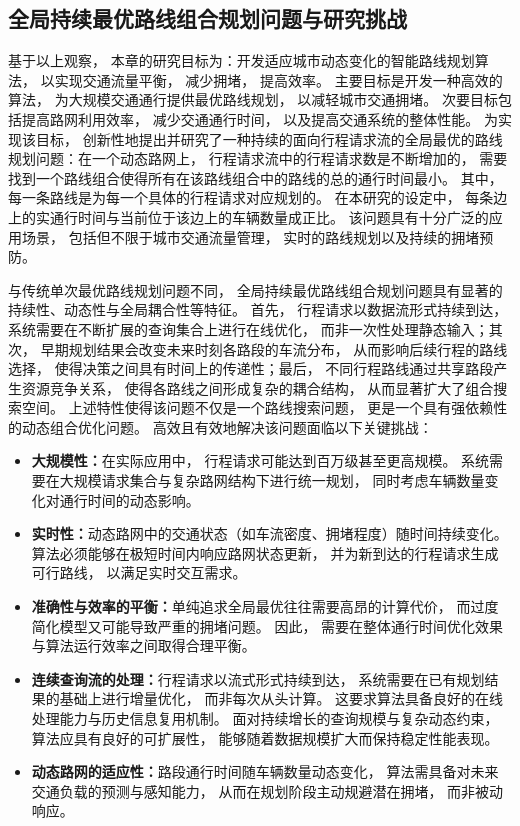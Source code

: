 \subsection{全局持续最优路线组合规划问题与研究挑战}
基于以上观察， 本章的研究目标为：开发适应城市动态变化的智能路线规划算法， 以实现交通流量平衡， 减少拥堵， 提高效率。 主要目标是开发一种高效的算法， 为大规模交通通行提供最优路线规划， 以减轻城市交通拥堵。 次要目标包括提高路网利用效率， 减少交通通行时间， 以及提高交通系统的整体性能。 为实现该目标， 创新性地提出并研究了一种持续的面向行程请求流的全局最优的路线规划问题：在一个动态路网上， 行程请求流中的行程请求数是不断增加的， 需要找到一个路线组合使得所有在该路线组合中的路线的总的通行时间最小。 其中， 每一条路线是为每一个具体的行程请求对应规划的。 在本研究的设定中， 每条边上的实通行时间与当前位于该边上的车辆数量成正比。 该问题具有十分广泛的应用场景， 包括但不限于城市交通流量管理， 实时的路线规划以及持续的拥堵预防。

与传统单次最优路线规划问题不同， 全局持续最优路线组合规划问题具有显著的持续性、动态性与全局耦合性等特征。 首先， 行程请求以数据流形式持续到达， 系统需要在不断扩展的查询集合上进行在线优化， 而非一次性处理静态输入；其次， 早期规划结果会改变未来时刻各路段的车流分布， 从而影响后续行程的路线选择， 使得决策之间具有时间上的传递性；最后， 不同行程路线通过共享路段产生资源竞争关系， 使得各路线之间形成复杂的耦合结构， 从而显著扩大了组合搜索空间。 上述特性使得该问题不仅是一个路线搜索问题， 更是一个具有强依赖性的动态组合优化问题。 高效且有效地解决该问题面临以下关键挑战：

\begin{itemize}
    \item \textbf{大规模性：}在实际应用中， 行程请求可能达到百万级甚至更高规模。 系统需要在大规模请求集合与复杂路网结构下进行统一规划， 同时考虑车辆数量变化对通行时间的动态影响。

    \item \textbf{实时性：}动态路网中的交通状态（如车流密度、拥堵程度）随时间持续变化。 算法必须能够在极短时间内响应路网状态更新， 并为新到达的行程请求生成可行路线， 以满足实时交互需求。

    \item \textbf{准确性与效率的平衡：}单纯追求全局最优往往需要高昂的计算代价， 而过度简化模型又可能导致严重的拥堵问题。 因此， 需要在整体通行时间优化效果与算法运行效率之间取得合理平衡。

    \item \textbf{连续查询流的处理：}行程请求以流式形式持续到达， 系统需要在已有规划结果的基础上进行增量优化， 而非每次从头计算。 这要求算法具备良好的在线处理能力与历史信息复用机制。 面对持续增长的查询规模与复杂动态约束， 算法应具有良好的可扩展性， 能够随着数据规模扩大而保持稳定性能表现。

    \item \textbf{动态路网的适应性：}路段通行时间随车辆数量动态变化， 算法需具备对未来交通负载的预测与感知能力， 从而在规划阶段主动规避潜在拥堵， 而非被动响应。

\end{itemize}

